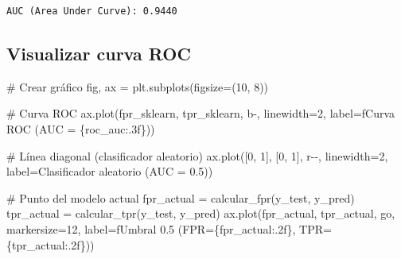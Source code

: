 \documentclass[
  doc,
  floatsintext,
  longtable,
  a4paper,
  nolmodern,
  notxfonts,
  notimes,
  12pt,
  colorlinks=true,linkcolor=blue,citecolor=blue,urlcolor=blue]{apa7}
\newenvironment{Shaded}{\begin{snugshade}}{\end{snugshade}}
\newcommand{\CommentTok}[1]{\textcolor[rgb]{0.37,0.37,0.37}{#1}}
\newcommand{\DecValTok}[1]{\textcolor[rgb]{0.68,0.00,0.00}{#1}}
\newcommand{\NormalTok}[1]{\textcolor[rgb]{0.00,0.23,0.31}{#1}}
\newcommand{\OperatorTok}[1]{\textcolor[rgb]{0.37,0.37,0.37}{#1}}
\newcommand{\SpecialCharTok}[1]{\textcolor[rgb]{0.37,0.37,0.37}{#1}}
\newcommand{\SpecialStringTok}[1]{\textcolor[rgb]{0.13,0.47,0.30}{#1}}
\newcommand{\StringTok}[1]{\textcolor[rgb]{0.13,0.47,0.30}{#1}}
\begin{document}
\begin{verbatim}
AUC (Area Under Curve): 0.9440
\end{verbatim}

\subsection{Visualizar curva ROC}\label{visualizar-curva-roc}

\begin{Shaded}
\begin{Highlighting}[]
\CommentTok{\# Crear gráfico}
\NormalTok{fig, ax }\OperatorTok{=}\NormalTok{ plt.subplots(figsize}\OperatorTok{=}\NormalTok{(}\DecValTok{10}\NormalTok{, }\DecValTok{8}\NormalTok{))}

\CommentTok{\# Curva ROC}
\NormalTok{ax.plot(fpr\_sklearn, tpr\_sklearn, }\StringTok{\textquotesingle{}b{-}\textquotesingle{}}\NormalTok{, linewidth}\OperatorTok{=}\DecValTok{2}\NormalTok{,}
\NormalTok{        label}\OperatorTok{=}\SpecialStringTok{f\textquotesingle{}Curva ROC (AUC = }\SpecialCharTok{\{}\NormalTok{roc\_auc}\SpecialCharTok{:.3f\}}\SpecialStringTok{)\textquotesingle{}}\NormalTok{)}

\CommentTok{\# Línea diagonal (clasificador aleatorio)}
\NormalTok{ax.plot([}\DecValTok{0}\NormalTok{, }\DecValTok{1}\NormalTok{], [}\DecValTok{0}\NormalTok{, }\DecValTok{1}\NormalTok{], }\StringTok{\textquotesingle{}r{-}{-}\textquotesingle{}}\NormalTok{, linewidth}\OperatorTok{=}\DecValTok{2}\NormalTok{, label}\OperatorTok{=}\StringTok{\textquotesingle{}Clasificador aleatorio (AUC = 0.5)\textquotesingle{}}\NormalTok{)}

\CommentTok{\# Punto del modelo actual}
\NormalTok{fpr\_actual }\OperatorTok{=}\NormalTok{ calcular\_fpr(y\_test, y\_pred)}
\NormalTok{tpr\_actual }\OperatorTok{=}\NormalTok{ calcular\_tpr(y\_test, y\_pred)}
\NormalTok{ax.plot(fpr\_actual, tpr\_actual, }\StringTok{\textquotesingle{}go\textquotesingle{}}\NormalTok{, markersize}\OperatorTok{=}\DecValTok{12}\NormalTok{,}
\NormalTok{        label}\OperatorTok{=}\SpecialStringTok{f\textquotesingle{}Umbral 0.5 (FPR=}\SpecialCharTok{\{}\NormalTok{fpr\_actual}\SpecialCharTok{:.2f\}}\SpecialStringTok{, TPR=}\SpecialCharTok{\{}\NormalTok{tpr\_actual}\SpecialCharTok{:.2f\}}\SpecialStringTok{)\textquotesingle{}}\NormalTok{)}


\end{Highlighting}
\end{Shaded}
\end{document}
